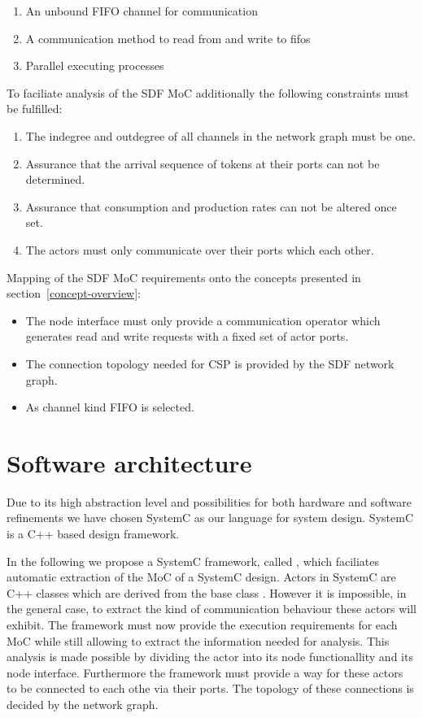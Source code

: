 \begin{enumerate}
\item An unbound FIFO channel for communication
\item A communication method to read from and write to fifos
\item Parallel executing processes
\end{enumerate}

To faciliate analysis of the SDF MoC additionally the following
constraints must be fulfilled:
\begin{enumerate}
\item The indegree and outdegree of all channels in the network graph must be one.
\item Assurance that the arrival sequence of tokens at
      their ports can not be determined.
\item Assurance that consumption and production rates can not
      be altered once set.
\item The actors must only communicate over their ports which each other.
\end{enumerate}

Mapping of the SDF MoC requirements onto the concepts presented in
section~\ref{concept-overview}:

\begin{itemize}

\item The node interface must only provide a communication operator which
      generates read and write requests with a fixed set of actor ports.

\item The connection topology needed for CSP is provided by the SDF network graph.

\item As channel kind FIFO is selected.

\end{itemize}

\section{Software architecture}

Due to its high abstraction level and possibilities for both
hardware and software refinements we have chosen SystemC
\cite{systemc-lrm:2003} \cite{glms:2002} as our language for system design.
SystemC is a C++ based design framework.

In the following we propose a SystemC framework, called \SysteMoC, which
faciliates automatic extraction of the MoC of a SystemC design.
Actors in SystemC are C++ classes which are derived from the base class .
However it is impossible, in the general case, to extract the kind of communication
behaviour these actors will exhibit. The \SysteMoC{} framework must now provide the
execution requirements for each MoC while still allowing to extract the information
needed for analysis. This analysis is made possible by dividing the actor into its
node functionallity and its node interface.
Furthermore the \SysteMoC{} framework must provide a way for these
actors to be connected to each othe via their ports. The topology of these connections
is decided by the network graph.

